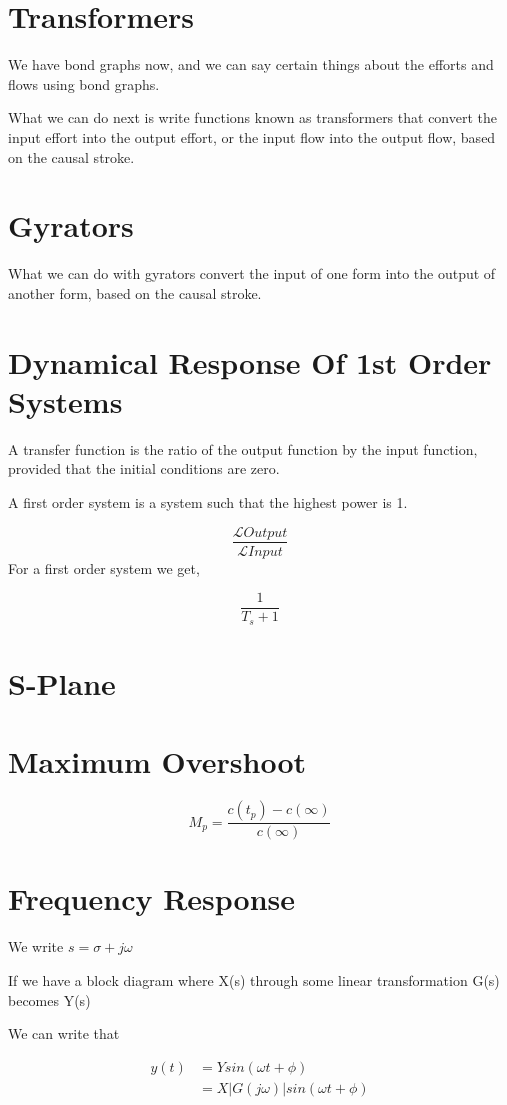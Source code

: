 \documentclass[11pt]{report}
\begin{document}
\section{Transformers}
\label{sec:org59a83b4}
We have bond graphs now, and we can say certain things about the efforts and flows using bond graphs.

What we can do next is write functions known as transformers that convert the input effort into the output effort, or the input flow into the output flow, based on the causal stroke.
\section{Gyrators}
\label{sec:orgc5625db}
What we can do with gyrators convert the input of one form into the output of another form, based on the causal stroke.
\section{Dynamical Response Of 1st Order Systems}
\label{sec:org95c784a}
A transfer function is the ratio of the output function by the input function, provided that the initial conditions are zero.

A first order system is a system such that the highest power is 1.

$$\frac{\mathcal{L}{Output}}{\mathcal{L}{Input}}$$
For a first order system we get,

$$\frac{1}{T_s+1}$$
\section{S-Plane}
\label{sec:org990f47e}
\section{Maximum Overshoot}
\label{sec:org9f867a0}
$$M_p=\frac{c(t_p)-c(\infty)}{c(\infty)}$$
\section{Frequency Response}
\label{sec:orgc2eb8bb}

We write \(s = \sigma + j \omega\)

If we have a block diagram where X(s) through some linear transformation G(s) becomes Y(s)

We can write that

\begin{align*}
y(t) &= Y sin(\omega t + \phi) \\
&= X |G(j \omega)| sin(\omega t + \phi)
\end{align*}
\end{document}
